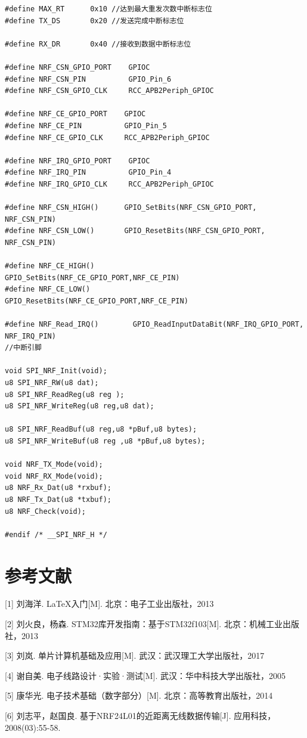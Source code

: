 \documentclass[UTF8,a4paper,11pt]{article}
\begin{document}
\begin{lstlisting}[caption={}]
#define MAX_RT      0x10 //达到最大重发次数中断标志位
#define TX_DS		0x20 //发送完成中断标志位	  

#define RX_DR		0x40 //接收到数据中断标志位

#define NRF_CSN_GPIO_PORT    GPIOC
#define NRF_CSN_PIN          GPIO_Pin_6
#define NRF_CSN_GPIO_CLK     RCC_APB2Periph_GPIOC

#define NRF_CE_GPIO_PORT    GPIOC
#define NRF_CE_PIN          GPIO_Pin_5
#define NRF_CE_GPIO_CLK     RCC_APB2Periph_GPIOC

#define NRF_IRQ_GPIO_PORT    GPIOC
#define NRF_IRQ_PIN          GPIO_Pin_4
#define NRF_IRQ_GPIO_CLK     RCC_APB2Periph_GPIOC

#define NRF_CSN_HIGH()      GPIO_SetBits(NRF_CSN_GPIO_PORT, NRF_CSN_PIN)
#define NRF_CSN_LOW()       GPIO_ResetBits(NRF_CSN_GPIO_PORT, NRF_CSN_PIN)		        

#define NRF_CE_HIGH()	      GPIO_SetBits(NRF_CE_GPIO_PORT,NRF_CE_PIN)
#define NRF_CE_LOW()	      GPIO_ResetBits(NRF_CE_GPIO_PORT,NRF_CE_PIN)			      

#define NRF_Read_IRQ()		  GPIO_ReadInputDataBit(NRF_IRQ_GPIO_PORT, NRF_IRQ_PIN)  
//中断引脚

void SPI_NRF_Init(void);
u8 SPI_NRF_RW(u8 dat);
u8 SPI_NRF_ReadReg(u8 reg );
u8 SPI_NRF_WriteReg(u8 reg,u8 dat);

u8 SPI_NRF_ReadBuf(u8 reg,u8 *pBuf,u8 bytes);
u8 SPI_NRF_WriteBuf(u8 reg ,u8 *pBuf,u8 bytes);	

void NRF_TX_Mode(void);
void NRF_RX_Mode(void);
u8 NRF_Rx_Dat(u8 *rxbuf);
u8 NRF_Tx_Dat(u8 *txbuf);
u8 NRF_Check(void); 

#endif /* __SPI_NRF_H */ 

\end{lstlisting}
\clearpage

\section*{参考文献}
[1] 刘海洋. \LaTeX 入门[M]. 北京：电子工业出版社，2013

[2] 刘火良，杨森. STM32库开发指南：基于STM32f103[M]. 北京：机械工业出版社，2013

[3] 刘岚. 单片计算机基础及应用[M]. 武汉：武汉理工大学出版社，2017

[4] 谢自美. 电子线路设计·实验·测试[M]. 武汉：华中科技大学出版社，2005

[5] 康华光. 电子技术基础（数字部分）[M]. 北京：高等教育出版社，2014

[6] 刘志平，赵国良. 基于NRF24L01的近距离无线数据传输[J]. 应用科技，2008(03):55-58.
\end{document}
